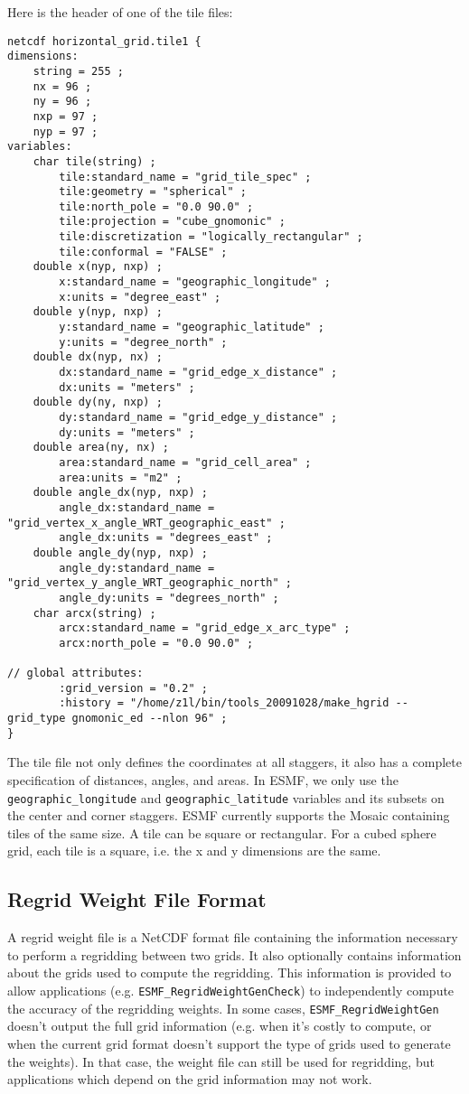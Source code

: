 Here is the header of one of the tile files:

\begin{verbatim}
netcdf horizontal_grid.tile1 {
dimensions:
	string = 255 ;
	nx = 96 ;
	ny = 96 ;
	nxp = 97 ;
	nyp = 97 ;
variables:
	char tile(string) ;
		tile:standard_name = "grid_tile_spec" ;
		tile:geometry = "spherical" ;
		tile:north_pole = "0.0 90.0" ;
		tile:projection = "cube_gnomonic" ;
		tile:discretization = "logically_rectangular" ;
		tile:conformal = "FALSE" ;
	double x(nyp, nxp) ;
		x:standard_name = "geographic_longitude" ;
		x:units = "degree_east" ;
	double y(nyp, nxp) ;
		y:standard_name = "geographic_latitude" ;
		y:units = "degree_north" ;
	double dx(nyp, nx) ;
		dx:standard_name = "grid_edge_x_distance" ;
		dx:units = "meters" ;
	double dy(ny, nxp) ;
		dy:standard_name = "grid_edge_y_distance" ;
		dy:units = "meters" ;
	double area(ny, nx) ;
		area:standard_name = "grid_cell_area" ;
		area:units = "m2" ;
	double angle_dx(nyp, nxp) ;
		angle_dx:standard_name = "grid_vertex_x_angle_WRT_geographic_east" ;
		angle_dx:units = "degrees_east" ;
	double angle_dy(nyp, nxp) ;
		angle_dy:standard_name = "grid_vertex_y_angle_WRT_geographic_north" ;
		angle_dy:units = "degrees_north" ;
	char arcx(string) ;
		arcx:standard_name = "grid_edge_x_arc_type" ;
		arcx:north_pole = "0.0 90.0" ;

// global attributes:
		:grid_version = "0.2" ;
		:history = "/home/z1l/bin/tools_20091028/make_hgrid --grid_type gnomonic_ed --nlon 96" ;
}
\end{verbatim}

The tile file not only defines the coordinates at all staggers, it also has a complete specification of
distances, angles, and areas.  In ESMF, we only use the {\tt geographic\_longitude} and {\tt geographic\_latitude}
variables and its subsets on the center and corner staggers.  ESMF currently supports the Mosaic containing tiles of the same size.  
A tile can be square or rectangular.  For a cubed sphere grid, each tile is a square, i.e. the x and y
dimensions are the same.   

\subsection{Regrid Weight File Format}\label{sec:weightfileformat}

A regrid weight file is a NetCDF format file containing the information necessary to perform 
a regridding between two grids. It also optionally contains information about the grids used to compute
the regridding. This information is provided to allow applications (e.g. {\tt ESMF\_RegridWeightGenCheck}) to
independently compute the accuracy of the regridding weights. In some cases, {\tt ESMF\_RegridWeightGen} doesn't
output the full grid information (e.g. when it's costly to compute, or when the current grid format doesn't 
support the type of grids used to generate the weights). In that case, the weight file can still be used
for regridding, but applications which depend on the grid information may not work. 

